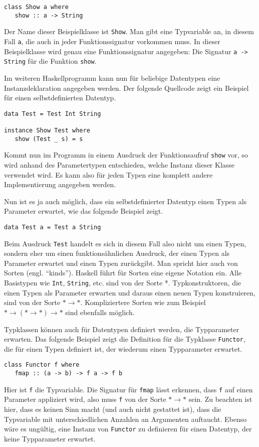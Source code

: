 \begin{verbatim}
class Show a where
   show :: a -> String
\end{verbatim}

Der Name dieser Beispielklasse ist \texttt{Show}. Man gibt eine Typvariable an, in diesem Fall \texttt{a}, die auch in jeder
Funktionssignatur vorkommen muss. In dieser Beispielklasse wird genau eine Funktionssignatur angegeben: Die Signatur
\texttt{a -> String} für die Funktion \texttt{show}.

Im weiteren Haskellprogramm kann nun für beliebige Datentypen eine Instanzdeklaration angegeben werden. Der folgende
Quellcode zeigt ein Beispiel für einen selbstdefinierten Datentyp.

\begin{verbatim}
data Test = Test Int String

instance Show Test where
   show (Test _ s) = s
\end{verbatim}

Kommt nun im Programm in einem Ausdruck der Funktionsaufruf \texttt{show} vor, so wird anhand des Parametertypen
entschieden, welche Instanz dieser Klasse verwendet wird. Es kann also für jeden Typen eine komplett andere Implementierung
angegeben werden.

Nun ist es ja auch möglich, dass ein selbstdefinierter Datentyp einen Typen als Parameter erwartet, wie das folgende Beispiel
zeigt.

\begin{verbatim}
data Test a = Test a String
\end{verbatim}

Beim Ausdruck \texttt{Test} handelt es sich in diesem Fall also nicht um einen Typen, sondern eher um einen funktionsähnlichen Ausdruck, der
einen Typen als Parameter erwartet und einen Typen zurückgibt. Man spricht hier auch von Sorten (engl. ``kinds''). Haskell
führt für Sorten eine eigene Notation ein. Alle Basistypen wie \texttt{Int}, \texttt{String}, etc. sind von der Sorte *.
Typkonstruktoren, die einen Typen als Parameter erwarten und daraus einen neuen Typen konstruieren, sind von der Sorte
$* \rightarrow *$.
Kompliziertere Sorten wie zum Beispiel $* \rightarrow (* \rightarrow *) \rightarrow *$ sind ebenfalls möglich.

Typklassen können auch für Datentypen definiert werden, die Typparameter erwarten. Das folgende Beispiel zeigt die
Definition für die Typklasse \texttt{Functor}, die für einen Typen definiert ist, der wiederum einen Typparameter erwartet.

\begin{verbatim}
class Functor f where
   fmap :: (a -> b) -> f a -> f b
\end{verbatim}

Hier ist \texttt{f} die Typvariable. Die Signatur für \texttt{fmap} lässt erkennen, dass \texttt{f} auf einen Parameter appliziert
wird, also muss \texttt{f} von der Sorte $* \rightarrow *$ sein. Zu beachten ist hier, dass es keinen Sinn macht (und auch nicht
gestattet ist), dass die Typvariable mit unterschiedlichen Anzahlen an Argumenten auftaucht. Ebenso wäre es ungültig,
eine Instanz von \texttt{Functor} zu definieren für einen Datentyp, der keine Typparameter erwartet.
